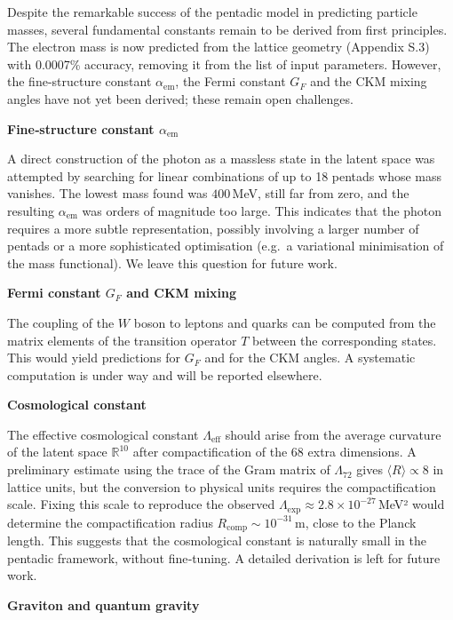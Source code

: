 \documentclass[11pt]{article}
\begin{document}
Despite the remarkable success of the pentadic model in predicting
particle masses, several fundamental constants remain to be derived from
first principles. The electron mass is now predicted from the lattice
geometry (Appendix S.3) with 0.0007\% accuracy, removing it from the
list of input parameters. However, the fine-structure constant
\(\alpha_{\text{em}}\), the Fermi constant \(G_F\) and the CKM mixing
angles have not yet been derived; these remain open challenges.

\textbf{Fine‑structure constant \(\alpha_{\text{em}}\)}

A direct construction of the photon as a massless state in the latent
space was attempted by searching for linear combinations of up to 18
pentads whose mass vanishes. The lowest mass found was \(400\)\,MeV,
still far from zero, and the resulting \(\alpha_{\text{em}}\) was orders
of magnitude too large. This indicates that the photon requires a more
subtle representation, possibly involving a larger number of pentads or
a more sophisticated optimisation (e.g.~a variational minimisation of
the mass functional). We leave this question for future work.

\textbf{Fermi constant \(G_F\) and CKM mixing}

The coupling of the \(W\) boson to leptons and quarks can be computed
from the matrix elements of the transition operator \(T\) between the
corresponding states. This would yield predictions for \(G_F\) and for
the CKM angles. A systematic computation is under way and will be
reported elsewhere.

\textbf{Cosmological constant}

The effective cosmological constant \(\Lambda_{\text{eff}}\) should
arise from the average curvature of the latent space \(\mathbb{R}^{10}\)
after compactification of the \(68\) extra dimensions. A preliminary
estimate using the trace of the Gram matrix of \(\Lambda_{72}\) gives
\(\langle R \rangle \propto 8\) in lattice units, but the conversion to
physical units requires the compactification scale. Fixing this scale to
reproduce the observed
\(\Lambda_{\text{exp}} \approx 2.8 \times 10^{-27}\)\,MeV² would
determine the compactification radius
\(R_{\text{comp}} \sim 10^{-31}\)\,m, close to the Planck length. This
suggests that the cosmological constant is naturally small in the
pentadic framework, without fine‑tuning. A detailed derivation is left
for future work.

\textbf{Graviton and quantum gravity}
\end{document}
